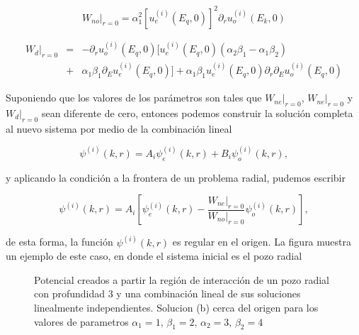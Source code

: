 \begin{equation*}
	W_{no}|_{r=0} = \alpha^2_1 [u^{(i)}_e(E_q,0)]^2 \partial_r u^{(i)}_o(E_k,0)
\end{equation*}

\begin{eqnarray*}
W_{d}|_{r=0} &=& -\partial_r u^{(i)}_o(E_q,0)[u^{(i)}_e(E_q,0)(\alpha_2 \beta_1 - \alpha_1 \beta_2) 
\\
&+& \alpha_1 \beta_1 \partial_E u^{(i)}_e(E_q,0)] + \alpha_1 \beta_1 u^{(i)}_e(E_q,0) \partial_r \partial_E u^{(i)}_o(E_q,0)
\end{eqnarray*}

Suponiendo que los valores de los parámetros son tales que $W_{ne}|_{r=0}$,  $W_{ne}|_{r=0}$ y $W_{d}|_{r=0}$ sean diferente de cero, entonces podemos construir la solución completa al nuevo sistema por medio de la combinación lineal

\begin{equation*}
\psi^{(i)}(k,r) = A_i \psi^{(i)}_{e}(k,r) + B_i \psi^{(i)}_{o}(k,r),
\end{equation*}

y aplicando la condición a la frontera de un problema radial, pudemos escribir

\begin{equation*}
\psi^{(i)}(k,r) = A_i \left[\psi^{(i)}_{e}(k,r) - \frac{W_{ne}|_{r=0}}{W_{no}|_{r=0}} \psi^{(i)}_{o}(k,r)\right], 
\end{equation*}

de esta forma, la función $\psi^{(i)}(k,r)$ es regular en el origen. La figura muestra un ejemplo de este caso, en donde el sistema inicial es el pozo radial

\begin{figure}
	\centering
	\hfill%
	\caption{\label{Fig_POAEO} 
		Potencial creados a partir la región de interacción de un pozo radial con profundidad $3$ y una combinación lineal de sus soluciones linealmente independientes. Solucion (b) cerca del origen para los valores de parametros $\alpha_1 = 1,\, \beta_1 = 2,\, \alpha_2 = 3,\, \beta_2 = 4$}
\end{figure} 




